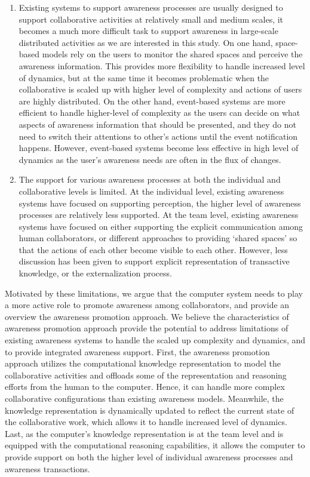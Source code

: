 \begin{enumerate}
   \item Existing systems to support awareness processes are usually designed to support collaborative activities at relatively small and medium scales, it becomes a much more difficult task to support awareness in large-scale distributed activities as we are interested in this study. On one hand, space-based models rely on the users to monitor the shared spaces and perceive the awareness information. This provides more flexibility to handle increased level of dynamics, but at the same time it becomes  problematic when the collaborative is scaled up with higher level of complexity and actions of users are highly distributed. On the other hand, event-based systems are more efficient to handle higher-level of complexity as the users can decide on what aspects of awareness information that should be presented, and they do not need to switch their attentions to other's actions until the event notification happens. However, event-based systems become less effective in high level of dynamics as the user's awareness needs are often in the flux of changes.
   \item The support for various awareness processes at both the individual and collaborative levels is limited. At the individual level, existing awareness systems have focused on supporting perception, the higher level of awareness processes are relatively less supported. At the team level, existing awareness systems have focused on either supporting the explicit communication among human collaborators, or different approaches to providing `shared spaces' so that the actions of each other become visible to each other. However, less discussion has been given to support explicit representation of transactive knowledge, or the externalization process.
\end{enumerate}

Motivated by these limitations, we argue that the computer system needs to play a more active role to promote awareness among collaborators, and provide an overview the awareness promotion approach. We believe the characteristics of awareness promotion approach provide the potential to address limitations of existing awareness systems to handle the scaled up complexity and dynamics, and to provide integrated awareness support. First, the awareness promotion approach utilizes the computational knowledge representation to model the collaborative activities and offloads some of the representation and reasoning efforts from the human to the computer. Hence, it can  handle more complex collaborative configurations than existing awareness models. Meanwhile, the knowledge representation is dynamically updated to reflect the current state of the collaborative work, which allows it to handle increased level of dynamics. Last, as the computer's knowledge representation is at the team level and is equipped with the computational reasoning capabilities, it allows the computer to provide support on both the higher level of individual awareness processes and awareness transactions.

